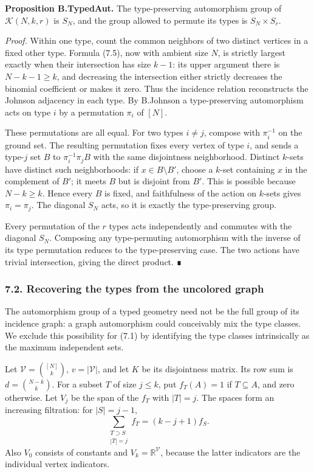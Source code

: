 \documentclass[
  11pt,
  a4paper,
]{article}
\begin{document}
\textbf{Proposition B.TypedAut.} The type-preserving automorphism group
of \(\mathcal K(N,k,r)\) is \(S_N\), and the group allowed to permute
its types is \(S_N\times S_r\).

\emph{Proof.} Within one type, count the common neighbors of two
distinct vertices in a fixed other type. Formula (7.5), now with ambient
size \(N\), is strictly largest exactly when their intersection has size
\(k-1\): its upper argument there is \(N-k-1\geq k\), and decreasing the
intersection either strictly decreases the binomial coefficient or makes
it zero. Thus the incidence relation reconstructs the Johnson adjacency
in each type. By B.Johnson a type-preserving automorphism acts on type
\(i\) by a permutation \(\pi_i\) of \([N]\).

These permutations are all equal. For two types \(i\ne j\), compose with
\(\pi_i^{-1}\) on the ground set. The resulting permutation fixes every
vertex of type \(i\), and sends a type-\(j\) set \(B\) to
\(\pi_i^{-1}\pi_j B\) with the same disjointness neighborhood. Distinct
\(k\)-sets have distinct such neighborhoods: if \(x\in B\setminus B'\),
choose a \(k\)-set containing \(x\) in the complement of \(B'\); it
meets \(B\) but is disjoint from \(B'\). This is possible because
\(N-k\geq k\). Hence every \(B\) is fixed, and faithfulness of the
action on \(k\)-sets gives \(\pi_i=\pi_j\). The diagonal \(S_N\) acts,
so it is exactly the type-preserving group.

Every permutation of the \(r\) types acts independently and commutes
with the diagonal \(S_N\). Composing any type-permuting automorphism
with the inverse of its type permutation reduces to the type-preserving
case. The two actions have trivial intersection, giving the direct
product. ∎

\subsubsection{7.2. Recovering the types from the uncolored
graph}\label{recovering-the-types-from-the-uncolored-graph}

The automorphism group of a typed geometry need not be the full group of
its incidence graph: a graph automorphism could conceivably mix the type
classes. We exclude this possibility for (7.1) by identifying the type
classes intrinsically as the maximum independent sets.

Let \(\mathscr V=\binom{[N]}k\), \(v=|\mathscr V|\), and let \(K\) be
its disjointness matrix. Its row sum is \(d=\binom{N-k}{k}\). For a
subset \(T\) of size \(j\leq k\), put \(f_T(A)=1\) if \(T\subseteq A\),
and zero otherwise. Let \(V_j\) be the span of the \(f_T\) with
\(|T|=j\). The spaces form an increasing filtration: for \(|S|=j-1\), \[
\sum_{\substack{T\supset S\\ |T|=j}} f_T=(k-j+1)f_S.
\tag{7.6}
\] Also \(V_0\) consists of constants and
\(V_k=\mathbb R^{\mathscr V}\), because the latter indicators are the
individual vertex indicators.
\end{document}
